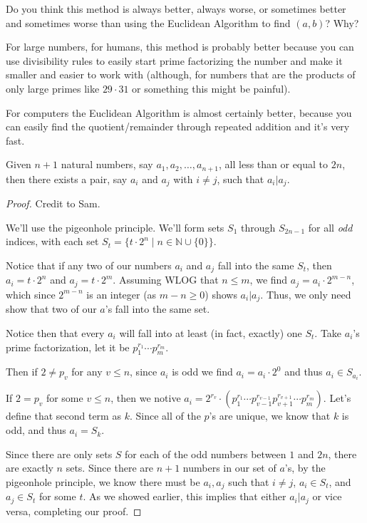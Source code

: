 \documentclass[../main.tex]{subfiles}
\begin{document}
\begin{ques} \label{2.17}
  Do you think this method is always better, always worse, or sometimes better and sometimes worse than using the Euclidean Algorithm to find $(a,b)$? Why?
\end{ques}

For large numbers, for humans, this method is probably better because you can use divisibility rules to easily start prime factorizing the number and make it smaller and easier to work with (although, for numbers that are the products of only large primes like $29 \cdot 31$ or something this might be painful).

For computers the Euclidean Algorithm is almost certainly better, because you can easily find the quotient/remainder through repeated addition and it's very fast.



\pagebreak



\begin{thm} \label{2.18}
  Given $n+1$ natural numbers, say $a_1, a_2, \ldots, a_{n+1}$, all less than or equal to $2n$, then there exists a pair, say $a_i$ and $a_j$ with $i \neq j$, such that $a_i | a_j$.
\end{thm}

\begin{proof}
  Credit to Sam.

  We'll use the pigeonhole principle. We'll form sets $S_1$ through $S_{2n-1}$ for all \emph{odd} indices, with each set $S_t = \{t \cdot 2^n \mid n \in \mathbb{N} \cup \{ 0\} \}$.

  Notice that if any two of our numbers $a_i$ and $a_j$ fall into the same $S_t$, then $a_i = t \cdot 2^{n}$ and $a_j = t \cdot 2^{m}$. Assuming WLOG that $n \leq m$, we find $a_j = a_i \cdot 2^{m-n}$, which since $2^{m-n}$ is an integer (as $m - n \geq 0$) shows $a_i | a_j$. Thus, we only need show that two of our $a$'s fall into the same set.

  Notice then that every $a_i$ will fall into at least (in fact, exactly) one $S_t$. Take $a_i$'s prime factorization, let it be $p_1^{r_1} \cdots p_m^{r_m}$.

  Then if $2 \neq p_v$ for any $v \leq n$, since $a_i$ is odd we find $a_i = a_i \cdot 2^{0}$ and thus $a_i \in S_{a_i}$.

  If $2 = p_v$ for some $v \leq n$, then we notive $a_i = 2^{r_v} \cdot (p_1^{r_1} \cdots p_{v-1}^{r_{v-1}} p_{v+1}^{r_{v+1}} \cdots p_m^{r_m})$. Let's define that second term as $k$. Since all of the $p$'s are unique, we know that $k$ is odd, and thus $a_i = S_{k}$.

  Since there are only sets $S$ for each of the odd numbers between $1$ and $2n$, there are exactly $n$ sets. Since there are $n+1$ numbers in our set of $a$'s, by the pigeonhole principle, we know there must be $a_i, a_j$ such that $i \neq j$, $a_i \in S_t$, and $a_j \in S_t$ for some $t$. As we showed earlier, this implies that either $a_i | a_j$ or vice versa, completing our proof.
\end{proof}
\end{document}
